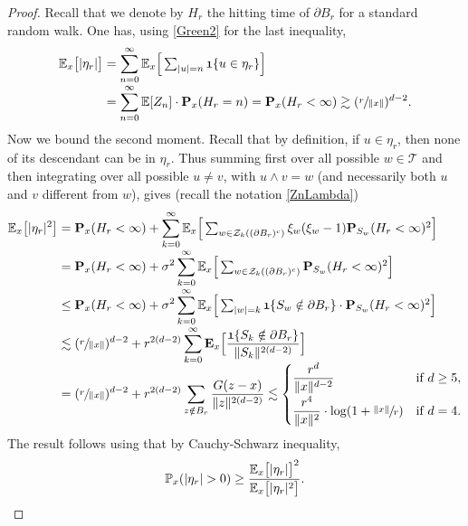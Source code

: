 \documentclass[11pt]{article}
\numberwithin{equation}{section}
\let\ts\textstyle
\theoremstyle{plain}
\theoremstyle{definition}
\newcommand{\1}{{\text{\Large $\mathfrak 1$}}}
\begin{document}
\begin{proof}
Recall that we denote by $H_r$ the hitting time of $\partial B_r$
for a standard random walk.
One has, using \eqref{Green2} for the last inequality,\vspace*{-3pt}
\begin{align*}
\mathbb E_x\big[|\eta_r|\big] & = \sum_{n=0}^\infty
\mathbb E_x\Big[\ts\sum_{|u|=n} \1\{u \in \eta_r \}\Big]\\[-3pt]
&=
\sum_{n=0}^\infty \mathbb E[Z_n] \cdot \mathbf P_x(H_r = n)
= \mathbf P_x(H_r<\infty ) \gtrsim (\sfrac r{\|x\|})^{d-2}.
\end{align*}
Now we bound the second moment.
Recall that by definition, if $u\in \eta_r$, then none of its descendant can be in $\eta_r$. Thus summing first over all possible
$w\in \mathbf{\mathcal T}$
and then integrating over all possible $u\neq v$, with $u\wedge v=w$
(and necessarily both $u$ and $v$ different from $w$), gives (recall the notation \eqref{ZnLambda})\vspace*{-3pt}
\begin{align*}
\mathbb E_x\big[|\eta_r|^2\big] & =
\mathbf P_x(H_r<\infty) + \sum_{k=0}^\infty
\mathbb E_x \Big[\ts\sum_{w\in \mathcal Z_k((\partial B_r)^c)} \xi_w(\xi_w-1)
\mathbf P_{S_w}(H_r<\infty)^2 \Big] \\[-3pt]
& = \mathbf P_x(H_r<\infty) + \sigma^2 \sum_{k=0}^\infty
\mathbb E_x\Big[\ts\sum_{w\in \mathcal Z_k((\partial B_r)^c)} \mathbf P_{S_w}(H_r<\infty)^2 \Big] \\[-3pt]
&\le \mathbf P_x(H_r<\infty) + \sigma^2 \sum_{k=0}^\infty
\mathbb E_x \Big[\ts\sum_{|w| = k} \1\{S_w\notin \partial B_r\}\cdot
\mathbf P_{S_w}(H_r<\infty)^2 \Big]\\[-3pt]
&\lesssim (\sfrac{r}{\|x\|})^{d-2} + r^{2(d-2)}\sum_{k=0}^\infty
\mathbf E_x\Big[\frac{\1\{S_k \notin \partial B_r\}}{\|S_k\|^{2(d-2)}}\Big]\\[-5pt]
&= (\sfrac{r}{\|x\|})^{d-2} + r^{2(d-2)}\sum_{z\notin B_r} \frac{G(z-x)}{\|z\|^{2(d-2)}}\lesssim
\begin{cases}
\dfrac{r^d}{\|x\|^{d-2}} & \text{if }d\ge 5, \\[7pt]
\dfrac{r^4}{\|x\|^2} \cdot \log (1+\sfrac{\|x\|}{r}) & \text{if }d=4.
\end{cases}
\end{align*}
The result follows using that by Cauchy-Schwarz inequality,
\[
\mathbb P_x(|\eta_r|>0) \ge \frac{\mathbb E_x\big[|\eta_r|\big]^2}{\mathbb E_x\big[|\eta_r|^2\big]}.\qedhere
\]
\end{proof}
\end{document}
